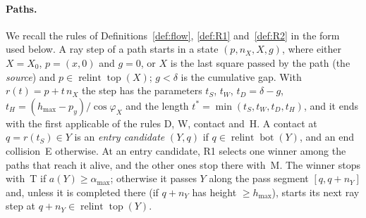 \documentclass[11pt]{amsart}
\newcommand{\relint}{\operatorname{relint}}
\newcommand{\Bot}{\operatorname{bot}}
\newcommand{\Top}{\operatorname{top}}
\newcommand{\amax}{\alpha_{\max}}
\newcommand{\hmax}{h_{\max}}
\theoremstyle{definition}
\theoremstyle{remark}
\numberwithin{equation}{section}
\begin{document}
\paragraph{Paths.} We recall the rules of Definitions~\ref{def:flow}, \ref{def:R1} and~\ref{def:R2} in the form used below. A ray step of a path starts in a state $(p,n_X,X,g)$, where either $X=X_0$, $p=(x,0)$ and $g=0$, or $X$ is the last square passed by the path (the \emph{source}) and $p\in\relint\Top(X)$; $g<\delta$ is the cumulative gap. With $r(t)=p+t\,n_X$ the step has the parameters $t_S$, $t_W$, $t_D=\delta-g$, $t_H=(\hmax-p_y)/\cos\varphi_X$ and the length $t^*=\min(t_S,t_W,t_D,t_H)$, and it ends with the first applicable of the rules D, W, contact and~H. A contact at $q=r(t_S)\in Y$ is an \emph{entry candidate} $(Y,q)$ if $q\in\relint\Bot(Y)$, and an end collision~E otherwise. At an entry candidate, R1 selects one winner among the paths that reach it alive, and the other ones stop there with~M. The winner stops with~T if $a(Y)\ge\amax$; otherwise it passes $Y$ along the pass segment $[q,q+n_Y]$ and, unless it is completed there (if $q+n_Y$ has height $\ge\hmax$), starts its next ray step at $q+n_Y\in\relint\Top(Y)$.
\end{document}
